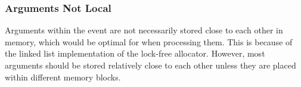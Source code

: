 \subsubsection{Arguments Not Local}
Arguments within the event are not necessarily stored close to each other in memory, which would be optimal for when processing them.
This is because of the linked list implementation of the lock-free allocator.
However, most arguments should be stored relatively close to each other unless they are
placed within different memory blocks.

